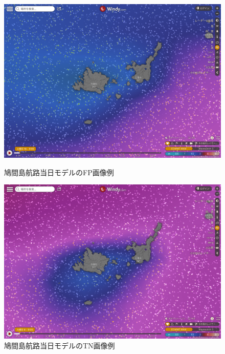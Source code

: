 \begin{figure}[htbp]
 \begin{minipage}{0.5\hsize}
  \begin{center}
   \includegraphics[keepaspectratio, scale=0.16]{fig/chapter4/wave_hatoma_0/FP.png}
  \end{center}
  \caption{鳩間島航路当日モデルのFP画像例}
  \label{hatoma_0_FP}
 \end{minipage}
 \begin{minipage}{0.5\hsize}
  \begin{center}
  \includegraphics[keepaspectratio, scale=0.16]{fig/chapter4/wave_hatoma_0/TN.png}
  \end{center}
   \caption{鳩間島航路当日モデルのTN画像例}
  \label{hatoma_0_TN}
 \end{minipage}
\end{figure}

